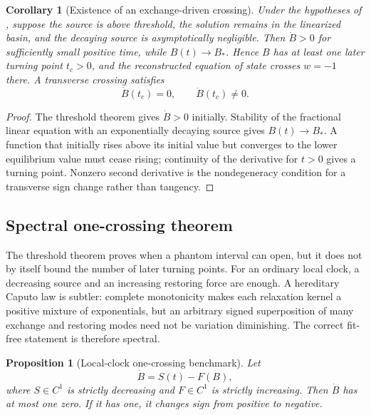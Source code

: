 \documentclass[11pt]{article}
\newtheorem{proposition}[theorem]{Proposition}
\newtheorem{corollary}[theorem]{Corollary}
\theoremstyle{definition}
\theoremstyle{remark}
\begin{document}
\begin{corollary}[Existence of an exchange-driven crossing]
\label{cor:exchange-driven-crossing}
Under the hypotheses of , suppose the
source is above threshold, the solution remains in the linearized basin, and the
decaying source is asymptotically negligible.  Then \(\dot B>0\) for sufficiently
small positive time, while \(B(t)\to B_*\).  Hence \(B\) has at least one later
turning point \(t_c>0\), and the reconstructed equation of state crosses
\(w=-1\) there.  A transverse crossing satisfies
\[
  \dot B(t_c)=0,
  \qquad
  \ddot B(t_c)\ne0.
\]
\end{corollary}

\begin{proof}
The threshold theorem gives \(\dot B>0\) initially.  Stability of the fractional
linear equation with an exponentially decaying source gives
\(B(t)\to B_*\).  A function that initially rises above its initial value but
converges to the lower equilibrium value must cease rising; continuity of the
derivative for \(t>0\) gives a turning point.  Nonzero second derivative is the
nondegeneracy condition for a transverse sign change rather than tangency.
\end{proof}


\subsection{Spectral one-crossing theorem}
\label{subsec:fit-free-crossing-topology}

The threshold theorem proves when a phantom interval can open, but it does not
by itself bound the number of later turning points.  For an ordinary local clock,
a decreasing source and an increasing restoring force are enough.  A hereditary
Caputo law is subtler: complete monotonicity makes each relaxation kernel a
positive mixture of exponentials, but an arbitrary signed superposition of many
exchange and restoring modes need not be variation diminishing.  The correct
fit-free statement is therefore spectral.

\begin{proposition}[Local-clock one-crossing benchmark]
\label{prop:local-clock-one-crossing}
Let
\[
  \dot B=S(t)-F(B),
\]
where \(S\in C^1\) is strictly decreasing and \(F\in C^1\) is strictly
increasing.  Then \(\dot B\) has at most one zero.  If it has one, it changes
sign from positive to negative.
\end{proposition}
\end{document}
